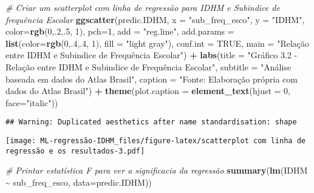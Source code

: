 \documentclass[
]{article}
\newenvironment{Shaded}{\begin{snugshade}}{\end{snugshade}}
\newcommand{\AttributeTok}[1]{\textcolor[rgb]{0.13,0.29,0.53}{#1}}
\newcommand{\CommentTok}[1]{\textcolor[rgb]{0.56,0.35,0.01}{\textit{#1}}}
\newcommand{\ConstantTok}[1]{\textcolor[rgb]{0.56,0.35,0.01}{#1}}
\newcommand{\DecValTok}[1]{\textcolor[rgb]{0.00,0.00,0.81}{#1}}
\newcommand{\FunctionTok}[1]{\textcolor[rgb]{0.13,0.29,0.53}{\textbf{#1}}}
\newcommand{\NormalTok}[1]{#1}
\newcommand{\SpecialCharTok}[1]{\textcolor[rgb]{0.81,0.36,0.00}{\textbf{#1}}}
\newcommand{\StringTok}[1]{\textcolor[rgb]{0.31,0.60,0.02}{#1}}
\begin{document}
\begin{Shaded}
\begin{Highlighting}[]
\CommentTok{\# Criar um scatterplot com linha de regressão para IDHM e Subindice de frequência Escolar}
\FunctionTok{ggscatter}\NormalTok{(predic.IDHM, }\AttributeTok{x =} \StringTok{"sub\_freq\_esco"}\NormalTok{, }\AttributeTok{y =} \StringTok{"IDHM"}\NormalTok{, }
          \AttributeTok{color=}\FunctionTok{rgb}\NormalTok{(}\DecValTok{0}\NormalTok{,.}\DecValTok{2}\NormalTok{,.}\DecValTok{5}\NormalTok{,  }\DecValTok{1}\NormalTok{), }\AttributeTok{pch=}\DecValTok{1}\NormalTok{, }\AttributeTok{add =} \StringTok{"reg.line"}\NormalTok{, }
          \AttributeTok{add.params =} \FunctionTok{list}\NormalTok{(}\AttributeTok{color=}\FunctionTok{rgb}\NormalTok{(}\DecValTok{0}\NormalTok{,.}\DecValTok{4}\NormalTok{,.}\DecValTok{4}\NormalTok{,  }\DecValTok{1}\NormalTok{), }\AttributeTok{fill =} \StringTok{"light gray"}\NormalTok{), }
          \AttributeTok{conf.int =} \ConstantTok{TRUE}\NormalTok{, }\AttributeTok{main =} \StringTok{"Relação entre IDHM e Subindice de Frequência Escolar"}\NormalTok{) }\SpecialCharTok{+}
  \FunctionTok{labs}\NormalTok{(}\AttributeTok{title =} \StringTok{"Gráfico 3.2 {-} Relação entre IDHM e Subindice de Frequência Escolar"}\NormalTok{,}
       \AttributeTok{subtitle =} \StringTok{"Análise baseada em dados do Atlas Brasil"}\NormalTok{,}
       \AttributeTok{caption =} \StringTok{"Fonte: Elaboração própria com dados do Atlas Brasil"}\NormalTok{) }\SpecialCharTok{+}
  \FunctionTok{theme}\NormalTok{(}\AttributeTok{plot.caption =} \FunctionTok{element\_text}\NormalTok{(}\AttributeTok{hjust =} \DecValTok{0}\NormalTok{, }\AttributeTok{face=}\StringTok{"italic"}\NormalTok{))}
\end{Highlighting}
\end{Shaded}

\begin{verbatim}
## Warning: Duplicated aesthetics after name standardisation: shape
\end{verbatim}

\texttt{[image: ML-regressão-IDHM\_files/figure-latex/scatterplot com linha de regressão e os resultados-3.pdf]}

\begin{Shaded}
\begin{Highlighting}[]
\CommentTok{\# Printar estatística F para ver a significacia da regressão}
\FunctionTok{summary}\NormalTok{(}\FunctionTok{lm}\NormalTok{(IDHM }\SpecialCharTok{\textasciitilde{}}\NormalTok{ sub\_freq\_esco, }\AttributeTok{data=}\NormalTok{predic.IDHM))}
\end{Highlighting}
\end{Shaded}
\end{document}
